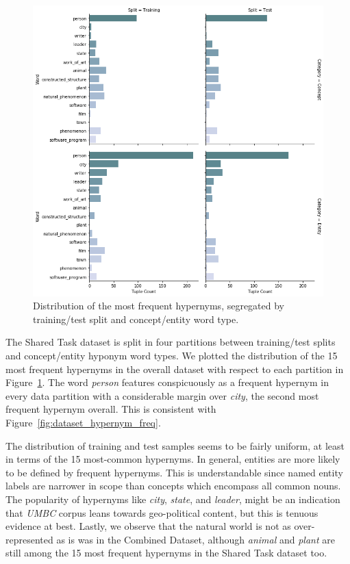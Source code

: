 \begin{figure}[ht!] 
  \centering
  \includegraphics[width=0.75\linewidth]{images/shared_task_MFH.png}
  \caption{Distribution of the most frequent hypernyms, segregated by training/test split and concept/entity word type.}
  \label{fig:shared_task_mfh}
\end{figure}
The Shared Task dataset is split in four partitions between training/test splits and concept/entity hyponym word types.  We plotted the distribution of the 15 most frequent hypernyms in the overall dataset with respect to each partition in Figure~\ref{fig:shared_task_mfh}.  The word \textit{person} features conspicuously as a frequent hypernym in every data partition with a considerable margin over \textit{city}, the second most frequent hypernym overall.  This is consistent with Figure~\ref{fig:dataset_hypernym_freq}.

The distribution of training and test samples seems to be fairly uniform, at least in terms of the 15 most-common hypernyms.  In general, entities are more likely to be defined by frequent hypernyms.  This is understandable since named entity labels are narrower in scope than concepts which encompass all common nouns.  The popularity of hypernyms like \textit{city}, \textit{state}, and \textit{leader}, might be an  indication that \textit{UMBC} corpus leans towards geo-political content, but this is tenuous evidence at best.  Lastly, we observe that the natural world is not as over-represented as is was in the Combined Dataset, although \textit{animal} and \textit{plant} are still among the 15 most frequent hypernyms in the Shared Task dataset too.

